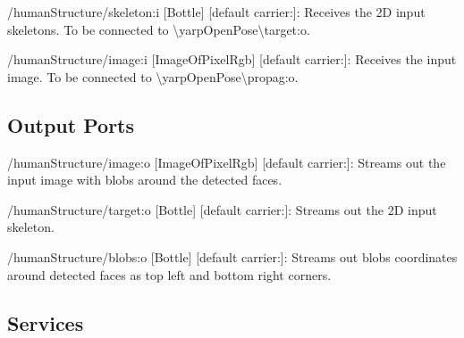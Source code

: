 \begin{DoxyItemize}
\item /human\+Structure/skeleton\+:i \mbox{[}Bottle\mbox{]} \mbox{[}default carrier\+:\mbox{]}\+: Receives the 2D input skeletons. To be connected to \textbackslash{}yarp\+Open\+Pose\textbackslash{}target\+:o.
\item /human\+Structure/image\+:i \mbox{[}Image\+Of\+Pixel\+Rgb\mbox{]} \mbox{[}default carrier\+:\mbox{]}\+: Receives the input image. To be connected to \textbackslash{}yarp\+Open\+Pose\textbackslash{}propag\+:o.
\end{DoxyItemize}\hypertarget{group__skeletonViewer_outputports_sec}{}\subsection{Output Ports}\label{group__skeletonViewer_outputports_sec}

\begin{DoxyItemize}
\item /human\+Structure/image\+:o \mbox{[}Image\+Of\+Pixel\+Rgb\mbox{]} \mbox{[}default carrier\+:\mbox{]}\+: Streams out the input image with blobs around the detected faces.
\item /human\+Structure/target\+:o \mbox{[}Bottle\mbox{]} \mbox{[}default carrier\+:\mbox{]}\+: Streams out the 2D input skeleton.
\item /human\+Structure/blobs\+:o \mbox{[}Bottle\mbox{]} \mbox{[}default carrier\+:\mbox{]}\+: Streams out blobs\textquotesingle{} coordinates around detected faces as top left and bottom right corners.
\end{DoxyItemize}\hypertarget{group__skeletonViewer_services_sec}{}\subsection{Services}\label{group__skeletonViewer_services_sec}
